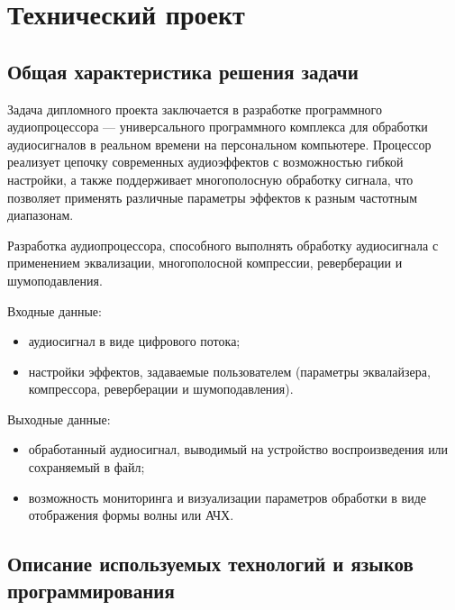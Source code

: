 \section{Технический проект}

\subsection{Общая характеристика решения задачи}

Задача дипломного проекта заключается в разработке программного аудиопроцессора — универсального программного комплекса для обработки аудиосигналов в реальном времени на персональном компьютере. Процессор реализует цепочку современных аудиоэффектов с возможностью гибкой настройки, а также поддерживает многополосную обработку сигнала, что позволяет применять различные параметры эффектов к разным частотным диапазонам.

Разработка аудиопроцессора, способного выполнять обработку аудиосигнала с применением эквализации, многополосной компрессии, реверберации и шумоподавления.

Входные данные:
\begin{itemize}
	\item аудиосигнал в виде цифрового потока; 
	\item настройки эффектов, задаваемые пользователем (параметры эквалайзера, компрессора, реверберации и шумоподавления).
\end{itemize}

Выходные данные:
\begin{itemize}
	\item обработанный аудиосигнал, выводимый на устройство воспроизведения или сохраняемый в файл; 
	\item возможность мониторинга и визуализации параметров обработки в виде отображения формы волны или АЧХ.
\end{itemize}

\subsection{ Описание используемых технологий и языков программирования}

